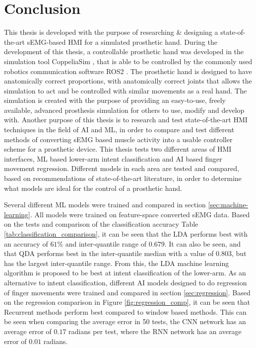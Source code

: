 \documentclass[../main.tex]{subfiles}
\begin{document}
\section{Conclusion}

This thesis is developed with the purpose of researching \& designing a state-of-the-art sEMG-based HMI for a simulated prosthetic hand.
During the development of this thesis, a controllable prosthetic hand was developed in the simulation tool CoppeliaSim \cite{coppeliasim}, that is able to be controlled by the commonly used robotics communication software ROS2 \cite{ros2}.
The prosthetic hand is designed to have anatomically correct proportions, with anatomically correct joints that allows the simulation to act and be controlled with similar movements as a real hand. 
The simulation is created with the purpose of providing an easy-to-use, freely available, advanced prosthesis simulation for others to use, modify and develop with. 
Another purpose of this thesis is to research and test state-of-the-art \gls{HMI} techniques in the field of \gls{AI} and \gls{ML}, in order to compare and test different methods of converting sEMG based muscle activity into a usable controller scheme for a prosthetic device.
This thesis tests two different areas of HMI interfaces, ML based lower-arm intent classification and AI based finger movement regression.
Different models in each area are tested and compared, based on recommendations of state-of-the-art
literature, in order to determine what models are ideal for the control of a prosthetic hand.

Several different ML models were trained and compared in section \ref{sec:machine-learning}.
All models were trained on feature-space converted sEMG data.
Based on the tests and comparison of the classification accuracy Table \ref{tab:classification_comparison}, it can be seen that the \gls{LDA} performs best with an accuracy of $61\%$ and inter-quantile range of $0.679$.
It can also be seen, and that \gls{QDA} performs best in the inter-quantile median with a value of $0.803$, but has the largest inter-quantile range.
From this, the LDA machine learning algorithm is proposed to be best at intent classification of the lower-arm.
As an alternative to intent classification, different AI models designed to do regression of finger movements were trained and compared in section \ref{sec:regression}.
Based on the regression comparison in Figure \ref{fig:regression_comp}, it can be seen that Recurrent methods perform best compared to window based methods.
This can be seen when comparing the average error in 50 tests, the \gls{CNN} network has an average error of $0.17$ radians per test, where the \gls{RNN} network has an average error of $0.01$ radians.
\end{document}
